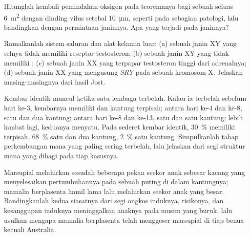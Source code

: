 \begin{exercise}[$\star\star$]\label{exo:b2:mammal-reproduction:9}
Hitunglah kembali pemindahan oksigen  pada teoremanya bagi
sebuah  seluas \qty{6}{m^2} dengan dinding vilus setebal
\qty{10}{\micro m}, seperti pada sebagian patologi, lalu bandingkan
dengan permintaan janinnya. Apa yang terjadi pada janinnya?
\end{exercise}

\begin{exercise}[$\star\star\star$]\label{exo:b2:mammal-reproduction:10}
Ramalkanlah sistem saluran dan alat kelamin luar: (a) sebuah janin XY
yang selnya tidak memiliki reseptor testosteron; (b) sebuah janin XY
yang tidak memiliki ; (c) sebuah janin XX yang
terpapar testosteron tinggi dari adrenalnya; (d) sebuah janin XX yang
mengusung \emph{SRY} pada sebuah kromosom X. Jelaskan masing-masingnya
dari hasil Jost.
\end{exercise}

\begin{exercise}[$\star\star\star$]\label{exo:b2:mammal-reproduction:11}
Kembar identik muncul ketika satu lembaga terbelah. Kalau ia terbelah
sebelum hari ke-3, kembarnya memiliki  dan kantung terpisah;
antara hari ke-4 dan ke-8, satu  dan dua kantung; antara hari
ke-8 dan ke-13, satu  dan satu kantung; lebih lambat lagi,
keduanya menyatu. Pada sederet kembar identik, \qty{30}{\%} memiliki
 terpisah, \qty{68}{\%} satu  dan dua kantung,
\qty{2}{\%} satu kantung. Simpulkanlah tahap perkembangan mana yang
paling sering terbelah, lalu jelaskan dari segi 
struktur mana yang dibagi pada tiap kasusnya.
\end{exercise}

\begin{exercise}[$\star\star\star$]\label{exo:b2:mammal-reproduction:12}
Marsupial melahirkan sesudah beberapa pekan seekor anak sebesar
kacang yang menyelesaikan pertumbuhannya pada sebuah puting di dalam
kantungnya; mamalia berplasenta hamil lama lalu melahirkan seekor anak
yang besar. Bandingkanlah kedua siasatnya dari segi ongkos induknya,
risikonya, dan kesanggupan induknya meninggalkan anaknya pada musim
yang buruk, lalu usulkan mengapa mamalia berplasenta telah menggeser
marsupial di tiap benua kecuali Australia.
\end{exercise}

